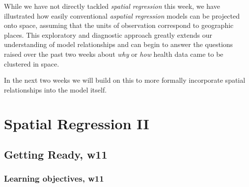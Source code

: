 \documentclass[
]{book}
\begin{document}
While we have not directly tackled \emph{spatial regression} this week, we have illustrated how easily conventional \emph{aspatial regression} models can be projected onto space, assuming that the units of observation correspond to geographic places. This exploratory and diagnostic approach greatly extends our understanding of model relationships and can begin to answer the questions raised over the past two weeks about \emph{why} or \emph{how} health data came to be clustered in space.

In the next two weeks we will build on this to more formally incorporate spatial relationships into the model itself.

\hypertarget{spatial-regression-ii}{%
\chapter{Spatial Regression II}\label{spatial-regression-ii}}

\hypertarget{getting-ready-w11}{%
\section{Getting Ready, w11}\label{getting-ready-w11}}

\hypertarget{learning-objectives-w11}{%
\subsection{Learning objectives, w11}\label{learning-objectives-w11}}

 
  \providecommand{\huxb}[2]{\arrayrulecolor[RGB]{#1}\global\arrayrulewidth=#2pt}
  \providecommand{\huxvb}[2]{\color[RGB]{#1}\vrule width #2pt}
  \providecommand{\huxtpad}[1]{\rule{0pt}{#1}}
  \providecommand{\huxbpad}[1]{\rule[-#1]{0pt}{#1}}
\end{document}
